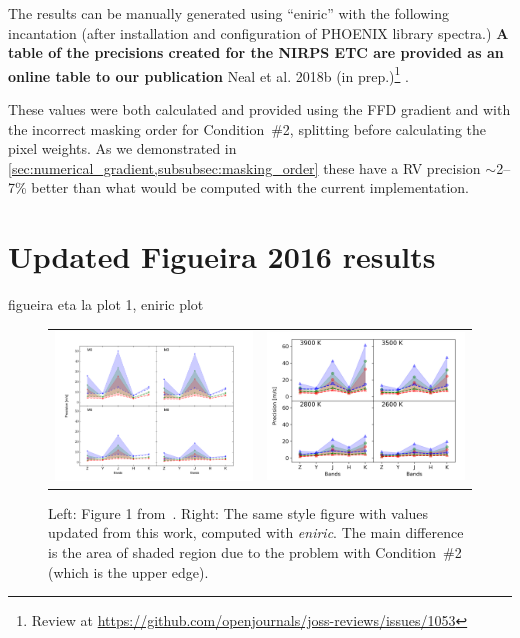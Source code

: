 The results can be manually generated using ``eniric'' with the following incantation (after installation and configuration of {PHOENIX} library spectra.)
\textbf{A table of the precisions created for the {NIRPS} ETC are provided as an online table to our publication} {Neal et al.
2018b (in prep.)}\footnote{Review at \href{https://github.com/openjournals/joss-reviews/issues/1053}{https://github.com/openjournals/joss-reviews/issues/1053}} .


These values were both calculated and provided using the {FFD} gradient and with the incorrect masking order for Condition~\#2, splitting before calculating the pixel weights.
As we demonstrated in \cref{sec:numerical_gradient,subsubsec:masking_order} these have a {RV} precision \(\sim\)2--7\% better than what would be computed with the current implementation.


\section{ Updated Figueira 2016 results}
 figueira eta la plot 1, eniric plot

\begin{figure}
    \centering
    \begin{tabular}{cc}
    \includegraphics[width=0.48\linewidth]{figures/information-content/Rvprec_vsini1.pdf} &  %
    \includegraphics[width=0.47\linewidth]{figures/information-content/precision_fourpanel.png}\\ %
    \end{tabular}
    \caption[Comparision of {RV} precision results to~\citet{figueira_radial_2016}.]{Left: Figure 1 from~\citet{figueira_radial_2016}.
        Right: The same style figure with values updated from this work, computed with \emph{eniric}.
The main difference is the area of shaded region due to the problem with Condition~\#2 (which is the upper edge).}
    \label{fig:my_label}
\end{figure}

